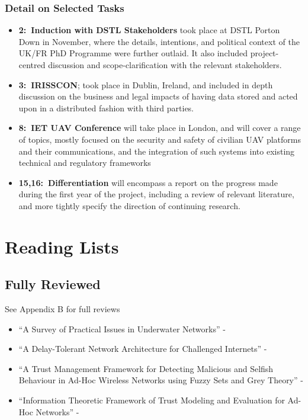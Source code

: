 \documentclass[twoside,10pt,a4paper]{Latex/Classes/PhDthesisPSnPDF}
\begin{document}
\subsection{Detail on Selected Tasks}
\begin{itemize}
  \item \textbf{2:~Induction with DSTL Stakeholders} took place at DSTL Porton 
    Down in November, where the details, intentions, and political context of 
    the UK/FR PhD Programme were further outlaid. It also included 
    project-centred discussion and scope-clarification with the relevant 
    stakeholders.
  \item \textbf{3:~IRISSCON}; took place in Dublin, Ireland, and included in 
    depth discussion on the business and legal impacts of having data stored 
    and acted upon in a distributed fashion with third parties.
  \item \textbf{8:~IET UAV Conference} will take place in London, and will 
    cover a range of topics, mostly focused on the security and safety of 
    civilian UAV platforms and their communications, and the integration of 
    such systems into existing technical and regulatory frameworks
  \item \textbf{15,16:~Differentiation} will encompass a report on the progress 
    made during the first year of the project, including a review of relevant 
    literature, and more tightly specify the direction of continuing research.
\end{itemize}



\pagebreak
\appendix
{}
\addappheadtotoc            %
\chapter{Reading Lists}
\section{Fully Reviewed}
See Appendix B for full reviews
\begin{itemize}
  \item ``A Survey of Practical Issues in Underwater Networks'' - \citet*{Partan2006}
  \item ``A Delay-Tolerant Network Architecture for Challenged Internets'' - \citet*{Fall2003}
  \item ``A Trust Management Framework for Detecting Malicious and Selfish
  Behaviour in Ad-Hoc Wireless Networks using Fuzzy Sets and Grey Theory'' - \citet*{Guo}
  \item ``Information Theoretic Framework of Trust Modeling and Evaluation for
  Ad-Hoc Networks'' - \citet*{Liu2006}
\end{itemize}
\end{document}
